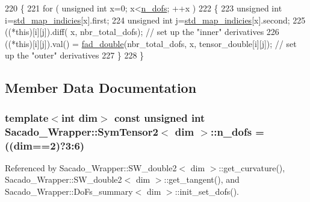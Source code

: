 \begin{DoxyCode}
220     \{
221          \textcolor{keywordflow}{for} ( \textcolor{keywordtype}{unsigned} \textcolor{keywordtype}{int} x=0; x<\hyperlink{classSacado__Wrapper_1_1SymTensor2_ad9d6542de5481e0d41bd1831cb0aeaff}{n\_dofs}; ++x )
222          \{
223             \textcolor{keywordtype}{unsigned} \textcolor{keywordtype}{int} i=\hyperlink{classSacado__Wrapper_1_1SymTensor2_a1c6b89438714315ae209f4687b687505}{std\_map\_indicies}[x].first;
224             \textcolor{keywordtype}{unsigned} \textcolor{keywordtype}{int} j=\hyperlink{classSacado__Wrapper_1_1SymTensor2_a1c6b89438714315ae209f4687b687505}{std\_map\_indicies}[x].second;
225             ((*this)[i][j]).diff( x, nbr\_total\_dofs);   \textcolor{comment}{// set up the "inner" derivatives}
226             ((*this)[i][j]).val() = \hyperlink{Sacado__Wrapper_8h_a868b94676739e612d9c95940e70892a9}{fad\_double}(nbr\_total\_dofs, x, tensor\_double[i][j]); \textcolor{comment}{// set up
       the "outer" derivatives}
227          \}
228     \}
\end{DoxyCode}


\subsection{Member Data Documentation}
\subsubsection[{\texorpdfstring{n\+\_\+dofs}{n_dofs}}]{\setlength{\rightskip}{0pt plus 5cm}template$<$int dim$>$ const unsigned {\bf int} {\bf Sacado\+\_\+\+Wrapper\+::\+Sym\+Tensor2}$<$ dim $>$\+::n\+\_\+dofs = ((dim==2)?3\+:6)\hspace{0.3cm}{\ttfamily [static]}}\hypertarget{classSacado__Wrapper_1_1SymTensor2_ad9d6542de5481e0d41bd1831cb0aeaff}{}\label{classSacado__Wrapper_1_1SymTensor2_ad9d6542de5481e0d41bd1831cb0aeaff}


Referenced by Sacado\+\_\+\+Wrapper\+::\+S\+W\+\_\+double2$<$ dim $>$\+::get\+\_\+curvature(), Sacado\+\_\+\+Wrapper\+::\+S\+W\+\_\+double2$<$ dim $>$\+::get\+\_\+tangent(), and Sacado\+\_\+\+Wrapper\+::\+Do\+Fs\+\_\+summary$<$ dim $>$\+::init\+\_\+set\+\_\+dofs().

